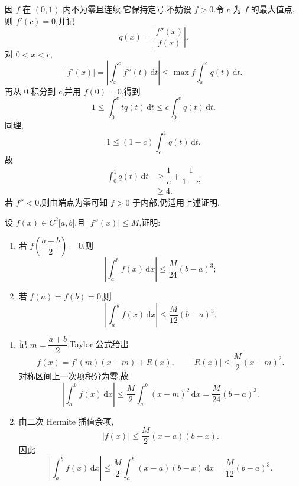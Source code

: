\begin{solution}
    因 $f$ 在 $(0,1)$ 内不为零且连续,它保持定号.不妨设 $f>0$.令 $c$ 为 $f$ 的最大值点,则 $f'(c)=0$,并记
    \[
        q(x)=\left|\dfrac{f''(x)}{f(x)}\right|.
    \]
    对 $0<x<c$,
    \[
        |f'(x)|=\left|\int_x^cf''(t)\,\mathrm{d}t\right|
        \leq\max f\int_x^cq(t)\,\mathrm{d}t.
    \]
    再从 $0$ 积分到 $c$,并用 $f(0)=0$,得到
    \[
        1\leq\int_0^c t q(t)\,\mathrm{d}t
        \leq c\int_0^cq(t)\,\mathrm{d}t.
    \]
    同理,
    \[
        1\leq(1-c)\int_c^1q(t)\,\mathrm{d}t.
    \]
    故
    \[
        \begin{aligned}
            \int_0^1q(t)\,\mathrm{d}t
             & \geq\dfrac{1}{c}+\dfrac{1}{1-c} \\
             & \geq4.
        \end{aligned}
    \]
    若 $f''<0$,则由端点为零可知 $f>0$ 于内部,仍适用上述证明.
\end{solution}

\begin{example}
    设 $f(x)\in C^2\lbrack a,b\rbrack$,且 $|f''(x)|\leq M$,证明:
    \begin{enumerate}
        \item 若 $f\left(\dfrac{a+b}{2}\right)=0$,则
              \[
                  \left|\int_a^bf(x)\,\mathrm{d}x\right|
                  \leq\dfrac{M}{24}(b-a)^3;
              \]
        \item 若 $f(a)=f(b)=0$,则
              \[
                  \left|\int_a^bf(x)\,\mathrm{d}x\right|
                  \leq\dfrac{M}{12}(b-a)^3.
              \]
    \end{enumerate}
\end{example}
\exampleblank

\begin{solution}
    \leavevmode
    \begin{enumerate}
        \item 记 $m=\dfrac{a+b}{2}$.Taylor 公式给出
              \[
                  f(x)=f'(m)(x-m)+R(x),
                  \qquad
                  |R(x)|\leq\dfrac{M}{2}(x-m)^2.
              \]
              对称区间上一次项积分为零,故
              \[
                  \left|\int_a^bf(x)\,\mathrm{d}x\right|
                  \leq\dfrac{M}{2}\int_a^b(x-m)^2\,\mathrm{d}x
                  =\dfrac{M}{24}(b-a)^3.
              \]

        \item 由二次 Hermite 插值余项,
              \[
                  |f(x)|\leq\dfrac{M}{2}(x-a)(b-x).
              \]
              因此
              \[
                  \left|\int_a^bf(x)\,\mathrm{d}x\right|
                  \leq\dfrac{M}{2}\int_a^b(x-a)(b-x)\,\mathrm{d}x
                  =\dfrac{M}{12}(b-a)^3.
              \]
    \end{enumerate}
\end{solution}

